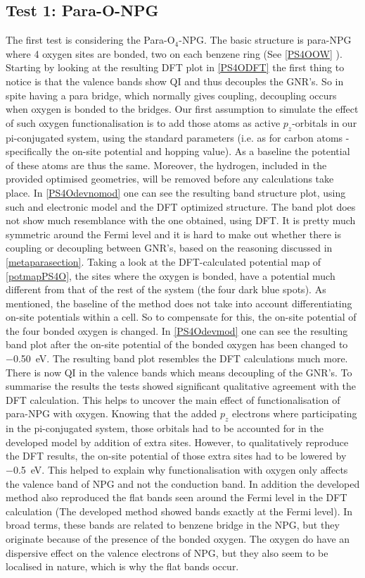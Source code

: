 \subsection{Test 1: Para-O-NPG}
The first test is considering the Para-O\(_4\)-NPG. The basic structure is para-NPG where 4 oxygen sites are bonded, two on each benzene ring (See \cref{PS4OOW} ). Starting by looking at the resulting DFT plot in \cref{PS4ODFT} the first thing to notice is that the valence bands show QI and thus decouples the GNR's. So in spite having a para bridge, which normally gives coupling, decoupling occurs when oxygen is bonded to the bridges. Our first assumption to simulate the effect of such oxygen functionalisation is to add those atoms as active \(p_z\)-orbitals in our pi-conjugated system, using the standard parameters (i.e. as for carbon atoms - specifically the on-site potential and hopping value). As a baseline the potential of these atoms are thus the same. Moreover, the hydrogen, included in the provided optimised geometries, will be removed before any calculations take place. In \cref{PS4Odevnomod} one can see the resulting band structure plot, using such and electronic model and the DFT optimized structure. The band plot does not show much resemblance with the one obtained, using DFT. It is pretty much symmetric around the Fermi level and it is hard to make out whether there is coupling or decoupling between GNR's, based on the reasoning discussed in \cref{metaparasection}. Taking a look at the DFT-calculated potential map of \cref{potmapPS4O}, the sites where the oxygen is bonded, have a potential much different from that of the rest of the system (the four dark blue spots). As mentioned, the baseline of the method does not take into account differentiating on-site potentials within a cell. So to compensate for this, the on-site potential of the four bonded oxygen is changed. In \cref{PS4Odevmod} one can see the resulting band plot after the on-site potential of the bonded oxygen has been changed to \SI{-0.50}{\electronvolt}. The resulting band plot resembles the DFT calculations much more. There is now QI in the valence bands which means decoupling of the GNR's. To summarise the results the tests showed significant qualitative agreement with the DFT calculation. This helps to uncover the main effect of functionalisation of para-NPG with oxygen. Knowing that the added \(p_z\) electrons where participating in the pi-conjugated system, those orbitals had to be accounted for in the developed model by addition of extra sites. However, to qualitatively reproduce the DFT results, the on-site potential of those extra sites had to be lowered by \SI{-0.5}{\electronvolt}. This helped to explain why functionalisation with oxygen only affects the valence band of NPG and not the conduction band. In addition the developed method also reproduced the flat bands seen around the Fermi level in the DFT calculation (The developed method showed bands exactly at the Fermi level). In broad terms, these bands are related to benzene bridge in the NPG, but they originate because of the presence of the bonded oxygen. The oxygen do have an dispersive effect on the valence electrons of NPG, but they also seem to be localised in nature, which is why the flat bands occur.   
